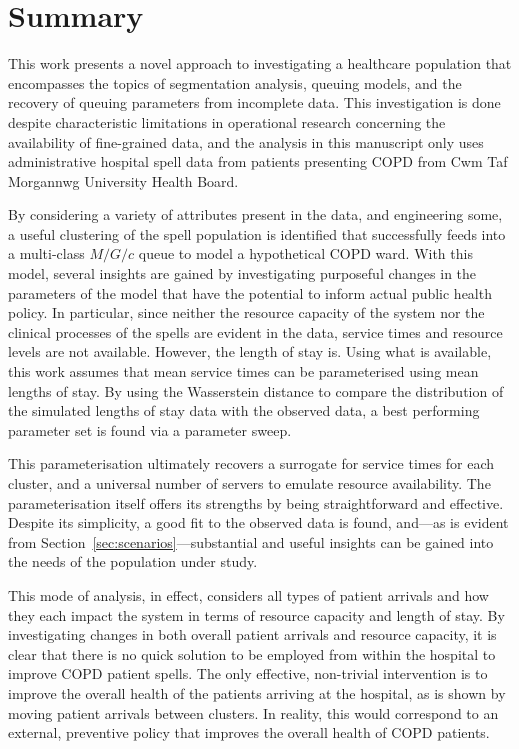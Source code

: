 \documentclass[]{interact}
\theoremstyle{plain}%
\theoremstyle{definition}
\theoremstyle{remark}
\newcommand{\ctmuhb}{Cwm Taf Morgannwg University Health Board}
\begin{document}
\section{Summary}\label{sec:summary}

This work presents a novel approach to investigating a healthcare population
that encompasses the topics of segmentation analysis, queuing models, and the
recovery of queuing parameters from incomplete data. This investigation is done
despite characteristic limitations in operational research concerning the
availability of fine-grained data, and the analysis in this manuscript only uses
administrative hospital spell data from patients presenting COPD from \ctmuhb.

By considering a variety of attributes present in the data, and engineering
some, a useful clustering of the spell population is identified that
successfully feeds into a multi-class \(M/G/c\) queue to model a hypothetical
COPD ward. With this model, several insights are gained by investigating
purposeful changes in the parameters of the model that have the potential to
inform actual public health policy. In particular, since neither the resource
capacity of the system nor the clinical processes of the spells are evident in
the data, service times and resource levels are not available. However, the
length of stay is. Using what is available, this work assumes that mean service
times can be parameterised using mean lengths of stay. By using the Wasserstein
distance to compare the distribution of the simulated lengths of stay data with
the observed data, a best performing parameter set is found via a parameter
sweep.

This parameterisation ultimately recovers a surrogate for service times for each
cluster, and a universal number of servers to emulate resource availability. The
parameterisation itself offers its strengths by being straightforward and
effective. Despite its simplicity, a good fit to the observed data is found,
and---as is evident from Section~\ref{sec:scenarios}---substantial and useful
insights can be gained into the needs of the population under study.

This mode of analysis, in effect, considers all types of patient arrivals and
how they each impact the system in terms of resource capacity and length of
stay. By investigating changes in both overall patient arrivals and resource
capacity, it is clear that there is no quick solution to be employed from within
the hospital to improve COPD patient spells. The only effective, non-trivial
intervention is to improve the overall health of the patients arriving at the
hospital, as is shown by moving patient arrivals between clusters. In reality,
this would correspond to an external, preventive policy that improves the
overall health of COPD patients.



\end{document}
